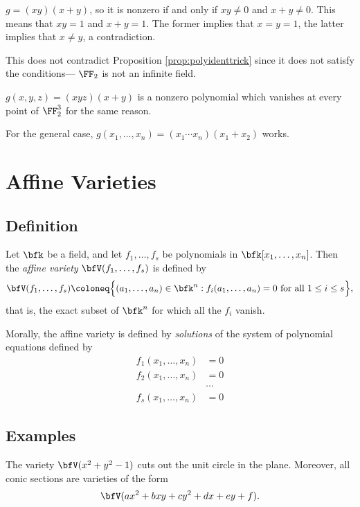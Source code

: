 \documentclass{article}
\begin{document}
$g = (xy)(x+y)$, so it is nonzero if and only if $xy \neq 0$ and $x+y \neq 0$.
This means that $xy = 1$ and $x+y = 1$.
The former implies that $x=y=1$, the latter implies that $x\neq y$, a contradiction.

This does not contradict Proposition \ref{prop:polyidenttrick} since it does not satisfy the conditions--- $\FF_2$ is not an infinite field.

$g(x,y,z) = (xyz)(x+y)$ is a nonzero polynomial which vanishes at every point of $\FF_2^3$ for the same reason.

For the general case, $g(x_1,\ldots,x_n) = (x_1\cdots x_n)(x_1 + x_2)$ works.

\section{Affine Varieties}

\subsection{Definition}

\begin{definition}
    Let $\bfk$ be a field, and let $f_1,\ldots,f_s$ be polynomials in $\bfk[x_1,\ldots,x_n]$.
    Then the \textit{affine variety} $\bfV(f_1,\ldots,f_s)$ is defined by
    \[
        \bfV(f_1,\ldots,f_s) \coloneq \Big\{(a_1,\ldots,a_n) \in \bfk^n: f_i(a_1,\ldots,a_n)=0 \text{ for all } 1 \leq i \leq s\Big\},
    \]
    that is, the exact subset of $\bfk^n$ for which all the $f_i$ vanish.
\end{definition}

Morally, the affine variety is defined by \textit{solutions} of the system of polynomial equations defined by
\begin{align*}
    f_1(x_1,\ldots,x_n) &= 0 \\
    f_2(x_1,\ldots,x_n) &= 0 \\
                        &\cdots \\
    f_s(x_1,\ldots,x_n) &= 0
\end{align*}

\subsection{Examples}

\begin{example}
    The variety $\bfV(x^2 + y^2 -1)$ cuts out the unit circle in the plane.
    Moreover, all conic sections are varieties of the form
    \[
        \bfV(ax^2 + bxy + cy^2 + dx + ey + f).
    \]
\end{example}
\end{document}
